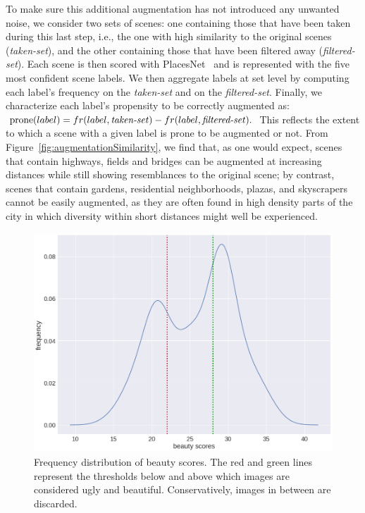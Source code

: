 To make sure this additional augmentation has not introduced any unwanted noise, we consider  two sets of scenes: one containing those that have been taken during this last step, i.e., the one with high similarity to the original scenes (\emph{taken-set}), and the other containing those that have been filtered away (\emph{filtered-set}). Each scene is then scored with PlacesNet~\cite{zhou2014learning} and is represented with the five most confident scene labels. We then aggregate labels at set level by computing each label's frequency on the \emph{taken-set} %
and on the \emph{filtered-set}. Finally, we characterize each label's propensity to be correctly augmented as: 
$ \textrm{prone}(label)= fr(label,\textrm{\emph{taken-set}}) - fr(label,\textrm{\emph{filtered-set}}).$
This reflects the extent to which a scene with a given label is prone to be augmented or not. From Figure~\ref{fig:augmentationSimilarity}, we find that, as one would expect, scenes that contain highways, fields and bridges can be augmented at increasing distances while still showing resemblances to the original scene; by contrast, scenes that contain gardens, residential neighborhoods, plazas, and skyscrapers cannot be easily augmented, as they are often found in high density parts of the city in which diversity within short distances might well be experienced. 


\begin{figure}[t!]
    \centering
    \includegraphics[width=0.7\columnwidth]{Trueskill.png}
    \caption{Frequency distribution of beauty scores. The red and green lines represent the thresholds below and above which images are considered ugly and beautiful. Conservatively, images in between are discarded.}
    \label{fig:Trueskill}
\end{figure}


